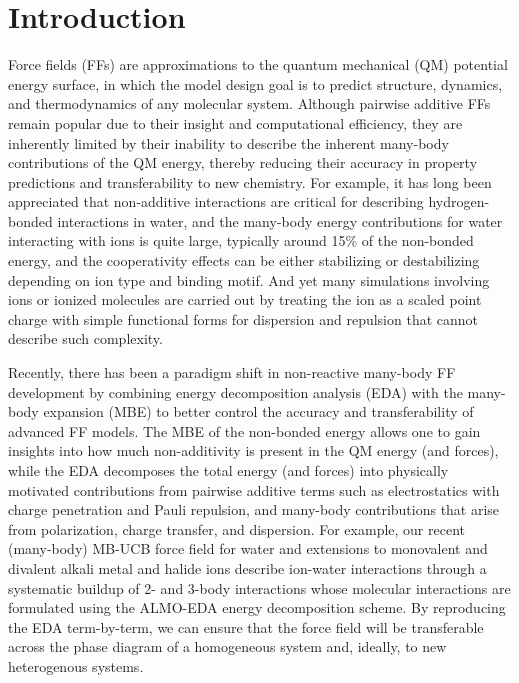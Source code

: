 \documentclass[journal=jctcce,manuscript=article]{achemso}
\begin{document}
\section*{Introduction}
Force fields (FFs) are approximations to the quantum mechanical (QM) potential energy surface, in which the model design goal is to predict structure, dynamics, and thermodynamics of any molecular system. Although pairwise additive FFs remain popular due to their insight and computational efficiency, they are inherently limited by their inability to describe the inherent many-body contributions of the QM energy, thereby reducing their accuracy in property predictions and transferability to new chemistry. For example, it has long been appreciated that non-additive interactions are critical for describing hydrogen-bonded interactions in water\cite{xantheas2000cooperativity}, and the many-body energy contributions for water interacting with ions is quite large, typically around 15\% of the non-bonded energy, and the cooperativity effects can be either stabilizing or destabilizing depending on ion type and binding motif.\cite{heindel2021many,herman2021many} And yet many simulations involving ions or ionized molecules are carried out by treating the
ion as a scaled point charge with simple functional forms for dispersion and repulsion that cannot describe such complexity.\cite{leontyev2011accounting,bedrov2019molecular}

Recently, there has been a paradigm shift in non-reactive many-body FF development by combining energy decomposition analysis (EDA)\cite{Szalewicz:2012:SAPT,Patkowski:2020:SAPT,Mao:2021:EDA-review} with the many-body expansion (MBE)\cite{demerdash2017assessing,heindel2020many,heindel2023many} to better control the accuracy and transferability of advanced FF models. The MBE of the non-bonded energy\cite{heindel2020many,heindel2021many,herman2021many} allows one to gain insights into how much non-additivity is present in the QM energy (and forces), while the EDA decomposes the total energy (and forces) into physically motivated contributions from pairwise additive terms such as electrostatics with charge penetration and Pauli repulsion, and many-body contributions that arise from polarization, charge transfer, and dispersion. For example, our recent (many-body) MB-UCB force field for water\cite{das2019development} and extensions to monovalent and divalent alkali metal and halide ions\cite{das2022development} describe ion-water interactions through a systematic buildup of 2- and 3-body interactions whose molecular interactions are formulated using the ALMO-EDA energy decomposition scheme.\cite{mao2021intermolecular} By reproducing the EDA term-by-term, we can ensure that the force field will be transferable across the phase diagram of a homogeneous system and, ideally, to new heterogenous systems.
\end{document}
